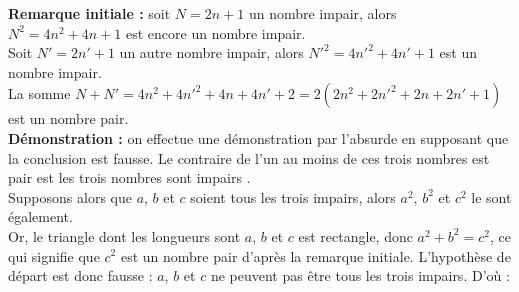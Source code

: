   {\bf Remarque initiale :} soit $N =2n+1$ un nombre impair, alors $N^2 =4n^2+4n+1$ est encore un nombre impair. \\
   Soit $N'=2n'+1$ un autre nombre impair, alors $N'^2 =4n'^2+4n'+1$ est un nombre impair. \\
   La somme $N+N'=4n^2+4n'^2+4n+4n'+2 =2(2n^2+2n'^2+2n+2n'+1)$ est un nombre pair. \\
   {\bf Démonstration :} on effectue une démonstration par l'absurde en supposant que la conclusion est fausse. Le contraire de \og l’un au moins de ces trois nombres est pair \fg{} est \og les trois nombres sont impairs \fg. \\
   Supposons alors que $a$, $b$ et $c$ soient tous les trois impairs, alors $a^2$, $b^2$ et $c^2$ le sont également. \\
   Or, le triangle dont les longueurs sont $a$, $b$ et $c$ est rectangle, donc $a^2 + b^2 = c^2$, ce qui signifie que $c^2$ est un nombre pair d'après la remarque initiale. L'hypothèse de départ est donc fausse : $a$, $b$ et $c$ ne peuvent pas être tous les trois impairs. D'où : 
